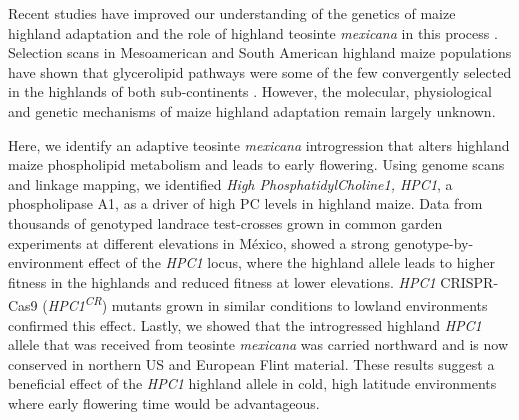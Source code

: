 \documentclass[9pt,twocolumn,twoside,lineno]{BioRxiv}
\begin{document}
Recent studies \cite{Wang2020-mp, Crow2020-gene} have improved our understanding of the genetics of maize highland adaptation and the role of highland teosinte \textit{mexicana} in this process \cite{Hufford2013-gs, Lauter2004-eq, pyhajarvi2013}.
Selection scans in Mesoamerican and South American highland maize populations have shown that glycerolipid pathways were some of the few convergently selected in the highlands of both sub-continents \cite{Takuno2015-uj}.
However, the molecular, physiological and genetic mechanisms of maize highland adaptation remain largely unknown.

Here, we identify an adaptive teosinte \textit{mexicana} introgression that alters highland maize phospholipid metabolism and leads to early flowering.
Using genome scans and linkage mapping, we identified \textit{High PhosphatidylCholine1, HPC1}, a phospholipase A1, as a driver of high PC levels in highland maize. 
Data from thousands of genotyped landrace test-crosses grown in common garden experiments at different elevations in México, showed a strong genotype-by-environment effect of the \textit{HPC1} locus, where the highland allele leads to higher fitness in the highlands and reduced fitness at lower elevations.
\textit{HPC1} CRISPR-Cas9 (\textit{HPC1\textsuperscript{CR}}) mutants grown in similar conditions to lowland environments confirmed this effect.
Lastly, we showed that the introgressed highland \textit{HPC1} allele that was received from teosinte \textit{mexicana} was carried northward and is now conserved in northern US and European Flint material.
These results suggest a beneficial effect of the \textit{HPC1} highland allele in cold, high latitude environments where early flowering time would be advantageous.
\end{document}
